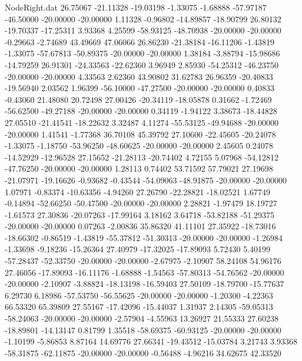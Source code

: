 \begin{filecontents}{NodeRight.dat}
  26.75067  -21.11328  -19.03198    -1.33075   -1.68888  -57.97187  -46.50000  -20.00000  -20.00000    1.11328   -0.96802  -14.89857  -18.90799
  26.80132  -19.70337  -17.25311     3.93368    4.25599  -58.93125  -48.70938  -20.00000  -20.00000   -0.29663   -2.74689   43.49669   47.06066
  26.86230  -21.38184  -16.11206    -1.43819   -1.33075  -57.67813  -50.89375  -20.00000  -20.00000    1.38184   -3.88794  -15.98686  -14.79259
  26.91301  -24.33563  -22.62360     3.96949    2.85930  -54.25312  -46.23750  -20.00000  -20.00000    4.33563    2.62360   43.90802   31.62783
  26.96359  -20.40833  -19.56940     2.03562    1.96399  -56.10000  -47.27500  -20.00000  -20.00000    0.40833   -0.43060   21.48080   20.72498
  27.00426  -20.34119  -18.05878     0.31662   -1.72469  -56.62500  -49.27188  -20.00000  -20.00000    0.34119   -1.94122    3.38673  -18.44828
  27.05510  -21.41541  -18.22632     3.32487    4.11274  -55.53125  -49.94688  -20.00000  -20.00000    1.41541   -1.77368   36.70108   45.39792
  27.10600  -22.45605  -20.24078    -1.33075   -1.18750  -53.96250  -48.60625  -20.00000  -20.00000    2.45605    0.24078  -14.52929  -12.96528
  27.15652  -21.28113  -20.74402     4.72155    5.07968  -54.12812  -47.76250  -20.00000  -20.00000    1.28113    0.74402   53.71592   57.79021
  27.19698  -21.07971  -19.16626    -0.93682   -0.43544  -54.09063  -48.91875  -20.00000  -20.00000    1.07971   -0.83374  -10.63356   -4.94260
  27.26790  -22.28821  -18.02521     1.67749   -0.14894  -52.66250  -50.47500  -20.00000  -20.00000    2.28821   -1.97479   18.19727   -1.61573
  27.30836  -20.07263  -17.99164     3.18162    3.64718  -53.82188  -51.29375  -20.00000  -20.00000    0.07263   -2.00836   35.86320   41.11101
  27.35922  -18.73016  -18.66302    -0.86519   -1.43819  -55.37812  -51.30313  -20.00000  -20.00000   -1.26984   -1.33698   -9.18236  -15.26364
  27.40979  -17.32025  -17.89093     5.72430    5.40199  -57.28437  -52.33750  -20.00000  -20.00000   -2.67975   -2.10907   58.24108   54.96176
  27.46056  -17.89093  -16.11176    -1.68888   -1.54563  -57.80313  -54.76562  -20.00000  -20.00000   -2.10907   -3.88824  -18.13198  -16.59403
  27.50109  -18.79700  -15.77637     6.29730    6.18986  -57.53750  -56.55625  -20.00000  -20.00000   -1.20300   -4.22363   66.53320   65.39809
  27.55167  -17.42096  -15.44037     1.31937    2.14305  -59.05313  -58.24063  -20.00000  -20.00000   -2.57904   -4.55963   13.26927   21.55333
  27.60238  -18.89801  -14.13147     0.81799    1.35518  -58.69375  -60.93125  -20.00000  -20.00000   -1.10199   -5.86853    8.87164   14.69776
  27.66341  -19.43512  -15.03784     3.21743    3.93368  -58.31875  -62.11875  -20.00000  -20.00000   -0.56488   -4.96216   34.62675   42.33520

\end{filecontents}
